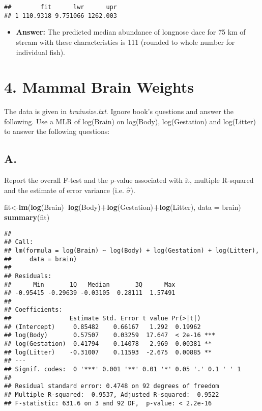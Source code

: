 \documentclass[]{article}
\newenvironment{Shaded}{\begin{snugshade}}{\end{snugshade}}
\newcommand{\KeywordTok}[1]{\textcolor[rgb]{0.13,0.29,0.53}{\textbf{#1}}}
\newcommand{\DataTypeTok}[1]{\textcolor[rgb]{0.13,0.29,0.53}{#1}}
\newcommand{\OperatorTok}[1]{\textcolor[rgb]{0.81,0.36,0.00}{\textbf{#1}}}
\newcommand{\NormalTok}[1]{#1}
\providecommand{\tightlist}{%
  \setlength{\itemsep}{0pt}\setlength{\parskip}{0pt}}
\begin{document}
\begin{verbatim}
##        fit      lwr      upr
## 1 110.9318 9.751066 1262.003
\end{verbatim}

\begin{itemize}
\tightlist
\item
  \textbf{Answer:} The predicted median abundance of longnose dace for
  75 km of stream with these characteristics is 111 (rounded to whole
  number for individual fish).
\end{itemize}

\section{4. Mammal Brain Weights}\label{mammal-brain-weights}

The data is given in \emph{brainsize.txt}. Ignore book's questions and
answer the following. Use a MLR of log(Brain) on log(Body),
log(Gestation) and log(Litter) to answer the following questions:

\subsection{A.}\label{a.-2}

Report the overall F-test and the p-value associated with it, multiple
R-squared and the estimate of error variance (i.e. \(\hat{\sigma}\)).

\begin{Shaded}
\begin{Highlighting}[]
\NormalTok{fit<-}\KeywordTok{lm}\NormalTok{(}\KeywordTok{log}\NormalTok{(Brain)}\OperatorTok{~}\KeywordTok{log}\NormalTok{(Body)}\OperatorTok{+}\KeywordTok{log}\NormalTok{(Gestation)}\OperatorTok{+}\KeywordTok{log}\NormalTok{(Litter), }\DataTypeTok{data =}\NormalTok{ brain)}
\KeywordTok{summary}\NormalTok{(fit)}
\end{Highlighting}
\end{Shaded}

\begin{verbatim}
## 
## Call:
## lm(formula = log(Brain) ~ log(Body) + log(Gestation) + log(Litter), 
##     data = brain)
## 
## Residuals:
##      Min       1Q   Median       3Q      Max 
## -0.95415 -0.29639 -0.03105  0.28111  1.57491 
## 
## Coefficients:
##                Estimate Std. Error t value Pr(>|t|)    
## (Intercept)     0.85482    0.66167   1.292  0.19962    
## log(Body)       0.57507    0.03259  17.647  < 2e-16 ***
## log(Gestation)  0.41794    0.14078   2.969  0.00381 ** 
## log(Litter)    -0.31007    0.11593  -2.675  0.00885 ** 
## ---
## Signif. codes:  0 '***' 0.001 '**' 0.01 '*' 0.05 '.' 0.1 ' ' 1
## 
## Residual standard error: 0.4748 on 92 degrees of freedom
## Multiple R-squared:  0.9537, Adjusted R-squared:  0.9522 
## F-statistic: 631.6 on 3 and 92 DF,  p-value: < 2.2e-16
\end{verbatim}
\end{document}
